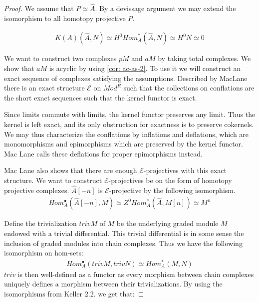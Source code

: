 \documentclass[../thesis.tex]{subfiles}
\begin{document}
            \begin{proof}
                We assume that $P \simeq \hat{A}$. By a devissage argument we may extend the isomorphism to all homotopy projective $P$. 

                \begin{align*}
                    K(A)(\hat{A}, N) \simeq H^0 {Hom}^*_A (\hat{A}, N) \simeq H^0 N \simeq 0
                \end{align*}

                We want to construct two complexes $pM$ and $aM$ by taking total complexes. We show that $aM$ is acyclic by using \ref{cor: ac-as-2}. To use it we will construct an exact sequence of complexes satisfying the assumptions. Described by MacLane \cite{MacLane94} there is an exact structure $\mathcal{E}$ on $Mod^R$ such that the collections on conflations are the short exact sequences such that the kernel functor is exact.
                \begin{center}
                \end{center}

                Since limits commute with limits, the kernel functor preserves any limit. Thus the kernel is left exact, and its only obstruction for exactness is to preserve cokernels. We may thus characterize the conflations by inflations and deflations, which are monomorphisms and epimorphisms which are preserved by the kernel functor. Mac Lane calls these deflations for proper epimorphisms instead.

                Mac Lane also shows that there are enough $\mathcal{E}$-projectives with this exact structure. We want to construct $\mathcal{E}$-projectives be on the form of homotopy projective complexes. $\hat{A}[-n]$ is $\mathcal{E}$-projective by the following isomorphism.
                \begin{align*}
                    Hom_A^\bullet (\hat{A}[-n], M) \simeq Z^0 Hom_A^* (\hat{A}, M[n]) \simeq M^n
                \end{align*}

                Define the trivialization $trivM$ of $M$ be the underlying graded module $M$ endowed with a trivial differential. This trivial differential is in some sense the inclusion of graded modules into chain complexes. Thus we have the following isomorphism on hom-sets:
                \begin{align*}
                    Hom_A^\bullet(trivM, trivN) \simeq Hom_A^*(M, N)
                \end{align*}
                $triv$ is then well-defined as a functor as every morphism between chain complexes uniquely defines a morphism between their trivializations. By using the isomorphisms from Keller \cite{Keller94} 2.2. we get that:


\end{proof}
\end{document}
